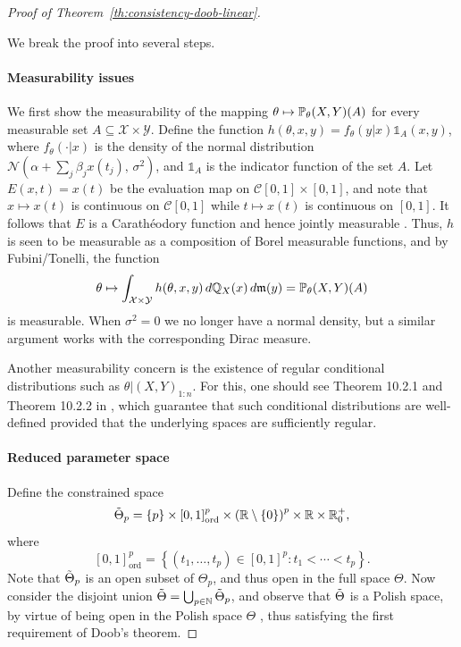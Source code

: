 \begin{proof}[Proof of Theorem~\ref{th:consistency-doob-linear}]\label{proof:consistency-doob-linear}
  
We break the proof into several steps.

\paragraph{Measurability issues} We first show the measurability of the mapping \(\theta \mapsto \mathbb{P}_\theta(X,Y)(A)\) for every measurable set \(A \subseteq \mathcal X \times \mathcal Y\). Define the function \(h(\theta, x, y)=f_\theta(y|x)\mathds{1}_A(x,y)\), where \(f_\theta(\cdot|x)\) is the density of the normal distribution \( \mathcal N(\alpha + \sum_j \beta_j x(t_j),\, \sigma^2)\), and \(\mathds{1}_{A}\) is the indicator function of the set \(A\). Let \(E(x,t)=x(t)\) be the evaluation map on \(\mathcal C[0,1]\times [0,1]\), and note that \(x\mapsto x(t)\) is continuous on \(\mathcal C[0,1]\) while \(t\mapsto x(t)\) is continuous on \([0,1]\). It follows that \(E\) is a Carathéodory function and hence jointly measurable \citep[][Lemma~4.51]{aliprantis2006infinite}. Thus, \(h\) is seen to be measurable as a composition of Borel measurable functions, and by Fubini/Tonelli, the function
\[
  \theta \mapsto \int_{\mathcal X \times \mathcal Y} h(\theta, x, y)\, d\mathbb{Q}_X(x)\,d\mathfrak{m}(y) = \mathbb{P}_\theta(X, Y)(A)
\]
is measurable. When \(\sigma^2=0\) we no longer have a normal density, but a similar argument works with the corresponding Dirac measure.

Another measurability concern is the existence of regular conditional distributions such as \(\theta|(X, Y)_{1:n}\). For this, one should see Theorem 10.2.1 and Theorem 10.2.2 in \citet{dudley2002real}, which guarantee that such conditional distributions are well-defined provided that the underlying spaces are sufficiently regular.

\paragraph{Reduced parameter space} Define the constrained space
\[\tilde{\Theta}_p = \left\{p\right\} \times [0,1]^p_{\text{ord}} \times \left(\mathbb{R} \setminus \{0\}\right)^p \times \mathbb{R} \times \mathbb{R}^+_0,
\]
where 
\[
[0,1]^p_{\text{ord}} =\left\{(t_1,\dots, t_p) \in [0,1]^p: t_1 < \cdots < t_p\right\}.
\]
Note that \(\tilde{\Theta}_p\) is an open subset of \(\Theta_p\), and thus open in the full space \(\Theta\). Now consider the disjoint union \(\tilde{\Theta} = \bigcup_{p\in \mathbb{N}}\tilde{\Theta}_p\), and observe that \(\tilde{\Theta}\) is a Polish space, by virtue of being open in the Polish space \(\Theta\) \citep[\S26]{bauer2001measure}, thus satisfying the first requirement of Doob's theorem.


\end{proof}
